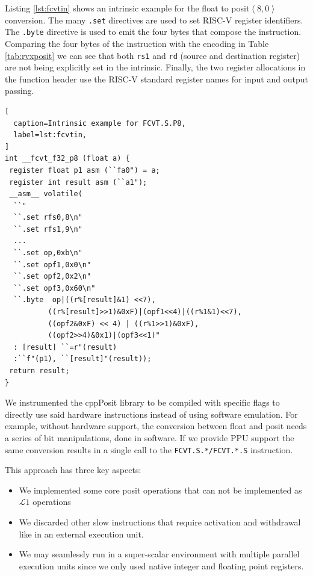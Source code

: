 Listing \ref{lst:fcvtin} shows an intrinsic example for the float to posit$\left<8,0\right>$ conversion. The many \texttt{.set} directives are used to set RISC-V register identifiers. The \texttt{.byte} directive is used to emit the four bytes that compose the instruction. Comparing the four bytes of the instruction with the encoding in Table \ref{tab:rvxposit} we can see that both \texttt{rs1} and \texttt{rd} (source and destination register) are not being explicitly set in the intrinsic. Finally, the two register allocations in the function header use the RISC-V standard register names for input and output passing.
\vspace{1em}
\begin{lstlisting}[
  caption=Intrinsic example for FCVT.S.P8,
  label=lst:fcvtin,
]
int __fcvt_f32_p8 (float a) {
 register float p1 asm (``fa0") = a;
 register int result asm (``a1");
 __asm__ volatile(
  ``"
  ``.set rfs0,8\n"
  ``.set rfs1,9\n"
  ...
  ``.set op,0xb\n"
  ``.set opf1,0x0\n"
  ``.set opf2,0x2\n"
  ``.set opf3,0x60\n"
  ``.byte  op|((r%[result]&1) <<7),
          ((r%[result]>>1)&0xF)|(opf1<<4)|((r%1&1)<<7),
          ((opf2&0xF) << 4) | ((r%1>>1)&0xF),
          ((opf2>>4)&0x1)|(opf3<<1)"
  : [result] ``=r"(result)
  :``f"(p1), ``[result]"(result));
 return result;
}
\end{lstlisting}

We instrumented the cppPosit library to be compiled with specific flags to directly use said hardware instructions instead of using software emulation. For example, without hardware support, the conversion between float and posit needs a series of bit manipulations, done in software. If we provide PPU support the same conversion results in a single call to the \texttt{FCVT.S.*/FCVT.*.S} instruction. 

This approach has three key aspects:
\begin{itemize}
    \item We implemented some core posit operations that can not be implemented as $\mathcal{L}1$ operations
    \item We discarded other slow instructions that require activation and withdrawal like in an external execution unit.
    \item We may seamlessly run in a super-scalar environment with multiple parallel execution units since we only used native integer and floating point registers.
\end{itemize}



